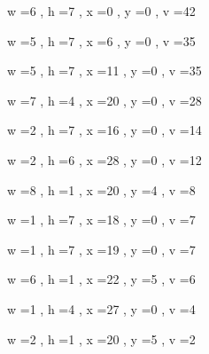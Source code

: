 \documentclass[11pt]{article}
\begin{document}
w =6 , h =7 , x =0 , y =0 , v =42
\par
w =5 , h =7 , x =6 , y =0 , v =35
\par
w =5 , h =7 , x =11 , y =0 , v =35
\par
w =7 , h =4 , x =20 , y =0 , v =28
\par
w =2 , h =7 , x =16 , y =0 , v =14
\par
w =2 , h =6 , x =28 , y =0 , v =12
\par
w =8 , h =1 , x =20 , y =4 , v =8
\par
w =1 , h =7 , x =18 , y =0 , v =7
\par
w =1 , h =7 , x =19 , y =0 , v =7
\par
w =6 , h =1 , x =22 , y =5 , v =6
\par
w =1 , h =4 , x =27 , y =0 , v =4
\par
w =2 , h =1 , x =20 , y =5 , v =2
\par
\newpage
\end{document}
